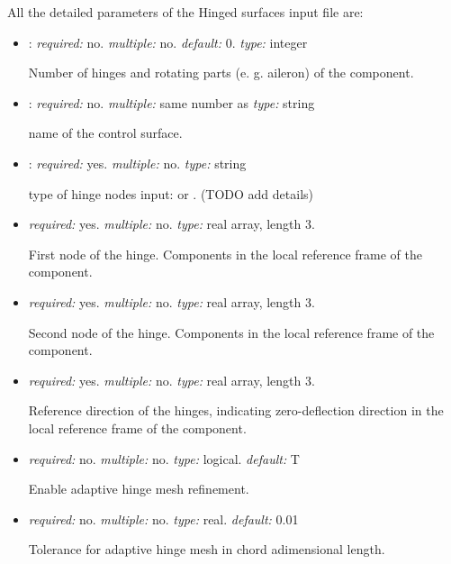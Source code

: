 All the detailed parameters of the Hinged surfaces input file are: 
\begin{itemize}
    \item {}: \textit{required:} no.  \textit{multiple:} no. \textit{default:} 0.
    \textit{type:} integer
    
    Number of hinges and rotating parts (e. g. aileron) of the component.
    
    \item {}: \textit{required:} no. \textit{multiple:} same number as  \textit{type:} string 
    
    name of the control surface.
    
    \item {}: \textit{required:} yes. \textit{multiple:} no. \textit{type:} string
    
    type of hinge nodes input:  or . (TODO add details)
    
    \item {} \textit{required:} yes. \textit{multiple:} no. \textit{type:} real array, length 3.
    
    First node of the hinge. Components in the local reference frame of the component.
    
    \item {} \textit{required:} yes. \textit{multiple:} no. \textit{type:} real array, length 3.
    
    Second node of the hinge. Components in the local reference frame of the component.
    
    \item {} \textit{required:} yes. \textit{multiple:} no. \textit{type:} real array, length 3. 
    
    Reference direction of the hinges, indicating zero-deflection direction in the local reference frame of the component.
    \item {} \textit{required:} no. \textit{multiple:} no. \textit{type:} logical. \textit{default:} T
    
    Enable adaptive hinge mesh refinement. 

    \item {} \textit{required:} no. \textit{multiple:} no. \textit{type:} real. \textit{default:} 0.01
    
    Tolerance for adaptive hinge mesh in chord adimensional length. 
    

\end{itemize}
